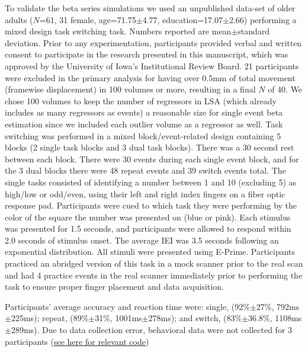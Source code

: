 \documentclass[phd,appendix,figures]{uithesis}
\begin{document}
To validate the beta series simulations we used an unpublished data-set
of older adults ($N$=61, 31 female, age=71.75$\pm$4.77, education=17.07$\pm$2.66)
performing a mixed design task switching task.
Numbers reported are mean$\pm$standard deviation.
Prior to any experimentation, participants provided verbal and written consent
to participate in the research presented in this manuscript, which was approved
by the University of Iowa's Institutional Review Board.
21 participants were excluded in the primary analysis for having over
0.5mm of total movement (framewise displacement) in 100 volumes or more,
resulting in a final $N$ of 40.
We chose 100 volumes to keep the number of regressors in LSA
(which already includes as many regressors as events) a reasonable size
for single event beta estimation since we included each outlier volume
as a regressor as well.
Task switching was performed in a mixed block/event-related design containing
5 blocks (2 single task blocks and 3 dual task blocks).
There was a 30 second rest between each block.
There were 30 events during each single event block,
and for the 3 dual blocks there were 48 repeat events and 39 switch events total.
The single tasks consisted of identifying a number between
1 and 10 (excluding 5) as high/low or odd/even, using their left and right index fingers
on a fiber optic response pad.
Participants were cued to which task they were performing by the color of the square
the number was presented on (blue or pink).
Each stimulus was presented for 1.5 seconds, and participants were allowed
to respond within 2.0 seconds of stimulus onset.
The average IEI was 3.5 seconds following an exponential distribution.
All stimuli were presented using E-Prime.
Participants practiced an abridged version of this task in a mock scanner
prior to the real scan and had 4 practice events in the real scanner immediately
prior to performing the task to ensure proper finger placement and data acquisition.

Participants' average accuracy and reaction time were:
single, (92\%$\pm$27\%, 792ms$\pm$225ms); repeat, (89\%$\pm$31\%, 1001ms$\pm$278ms);
and switch, (83\%$\pm$36.8\%, 1108ms$\pm$289ms).
Due to data collection error, behavioral data were not collected for 3 participants
(\href{https://github.com/jdkent/BetaSeriesRealDataAnalysis/blob/b18b44321edf7b662a1e5ea635f64452c8d3644c/summarizeBehavior/summarize_behavior.ipynb}{see here for relevant code})
\end{document}
